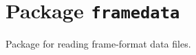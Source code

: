 \chapter{Package \texttt{framedata}}

Package for reading frame-format data files.

\newpage
\newpage
\newpage
